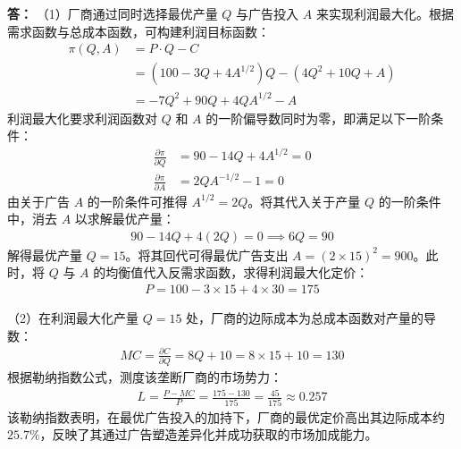 \begin{enumerate}[label=\textbf{\arabic*.}, leftmargin=*]
		\textbf{答：}
		（1）厂商通过同时选择最优产量 $Q$ 与广告投入 $A$ 来实现利润最大化。根据需求函数与总成本函数，可构建利润目标函数：
		\[
		\begin{aligned}
			\pi(Q, A) &= P \cdot Q - C \\
			&= (100 - 3Q + 4A^{1/2})Q - (4Q^2 + 10Q + A) \\
			&= -7Q^2 + 90Q + 4QA^{1/2} - A
		\end{aligned}
		\]
		利润最大化要求利润函数对 $Q$ 和 $A$ 的一阶偏导数同时为零，即满足以下一阶条件：
		\[
		\begin{aligned}
			\frac{\partial \pi}{\partial Q} &= 90 - 14Q + 4A^{1/2} = 0 \\
			\frac{\partial \pi}{\partial A} &= 2QA^{-1/2} - 1 = 0
		\end{aligned}
		\]
		由关于广告 $A$ 的一阶条件可推得 $A^{1/2} = 2Q$。将其代入关于产量 $Q$ 的一阶条件中，消去 $A$ 以求解最优产量：
		\[
		\begin{aligned}
			90 - 14Q + 4(2Q) = 0 \implies 6Q = 90
		\end{aligned}
		\]
		解得最优产量 $Q = 15$。将其回代可得最优广告支出 $A = (2 \times 15)^2 = 900$。此时，将 $Q$ 与 $A$ 的均衡值代入反需求函数，求得利润最大化定价：
		\[
		\begin{aligned}
			P = 100 - 3 \times 15 + 4 \times 30 = 175
		\end{aligned}
		\]
		
		（2）在利润最大化产量 $Q=15$ 处，厂商的边际成本为总成本函数对产量的导数：
		\[
		\begin{aligned}
			MC = \frac{\partial C}{\partial Q} = 8Q + 10 = 8 \times 15 + 10 = 130
		\end{aligned}
		\]
		根据勒纳指数公式，测度该垄断厂商的市场势力：
		\[
		\begin{aligned}
			L = \frac{P - MC}{P} = \frac{175 - 130}{175} = \frac{45}{175} \approx 0.257
		\end{aligned}
		\]
		该勒纳指数表明，在最优广告投入的加持下，厂商的最优定价高出其边际成本约 $25.7\%$，反映了其通过广告塑造差异化并成功获取的市场加成能力。
	\end{enumerate}
	\newpage
